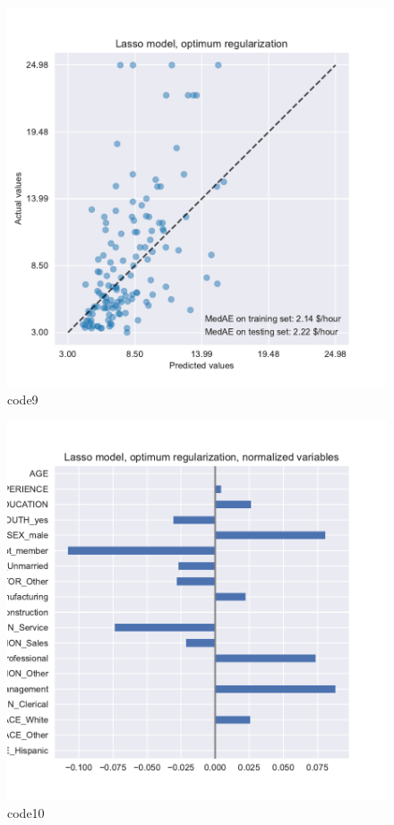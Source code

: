 \begin{figure}[htbp]
	\centering
	\includegraphics[width=14cm]{codeimage/code9}
	\caption{code9}
	\label{code9}
\end{figure}

\begin{figure}[htbp]
	\centering
	\includegraphics[width=14cm]{codeimage/code10}
	\caption{code10}
	\label{code10}
\end{figure}

